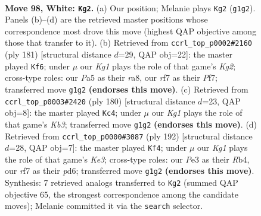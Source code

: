\documentclass[11pt]{article}
\begin{document}
\clearpage

\begin{figure}[p]\centering
\begin{subfigure}{0.46\textwidth}\centering
\resizebox{\linewidth}{!}{%
\newchessgame
\chessboard[
  setfen={8/5r2/p2k4/P1p2p1p/1p3P1P/4P1P1/1PR5/6K1 w - - 7 98},
  showmover=false,
  pgfstyle=straightmove, color=movearrow, markmove={g1-g2}
]}
\caption{}
\end{subfigure}\hfill
\begin{subfigure}{0.46\textwidth}\centering
\resizebox{\linewidth}{!}{%
\newchessgame
\chessboard[
  setfen={R7/5pk1/4p3/3p1p1p/3P3P/4P1P1/1r3P2/5K2 b - - 6 91},
  showmover=false,
  pgfstyle=straightmove, color=movearrow, markmove={g7-f6}
]}
\caption{}
\end{subfigure}
\\[4pt]
\begin{subfigure}{0.46\textwidth}\centering
\resizebox{\linewidth}{!}{%
\newchessgame
\chessboard[
  setfen={8/8/1p2k3/1P3p1p/3Pp1pP/1K2P1P1/5P2/8 w - - 6 91},
  showmover=false,
  pgfstyle=straightmove, color=movearrow, markmove={b3-c4}
]}
\caption{}
\end{subfigure}\hfill
\begin{subfigure}{0.46\textwidth}\centering
\resizebox{\linewidth}{!}{%
\newchessgame
\chessboard[
  setfen={4k3/4p3/p2pr3/P4p1p/1RP4P/4KPP1/8/8 w - - 0 97},
  showmover=false,
  pgfstyle=straightmove, color=movearrow, markmove={e3-f4}
]}
\caption{}
\end{subfigure}
\caption{\textbf{Move 98, White: \texttt{Kg2}.} (a) Our position; Melanie plays \texttt{Kg2} (\texttt{g1g2}). Panels (b)--(d) are the retrieved master positions whose correspondence most drove this move (highest QAP objective among those that transfer to it). (b) Retrieved from \texttt{ccrl\_top\_p0002\#2160} (ply 181) [structural distance $d$=29, QAP obj=22]: the master played \texttt{Kf6}; under $\mu$ our \emph{Kg1} plays the role of that game's \emph{Kg2}; cross-type roles: our \emph{P}a5 as their \emph{r}a8, our \emph{r}f7 as their \emph{P}f7; transferred move \texttt{g1g2} \textbf{(endorses this move)}. (c) Retrieved from \texttt{ccrl\_top\_p0003\#2420} (ply 180) [structural distance $d$=23, QAP obj=8]: the master played \texttt{Kc4}; under $\mu$ our \emph{Kg1} plays the role of that game's \emph{Kb3}; transferred move \texttt{g1g2} \textbf{(endorses this move)}. (d) Retrieved from \texttt{ccrl\_top\_p0000\#3087} (ply 192) [structural distance $d$=28, QAP obj=7]: the master played \texttt{Kf4}; under $\mu$ our \emph{Kg1} plays the role of that game's \emph{Ke3}; cross-type roles: our \emph{P}e3 as their \emph{R}b4, our \emph{r}f7 as their \emph{p}d6; transferred move \texttt{g1g2} \textbf{(endorses this move)}. Synthesis: 7 retrieved analogs transferred to \texttt{Kg2} (summed QAP objective 65, the strongest correspondence among the candidate moves); Melanie committed it via the \texttt{search} selector.}
\label{fig:thought-m194}
\end{figure}
\end{document}
